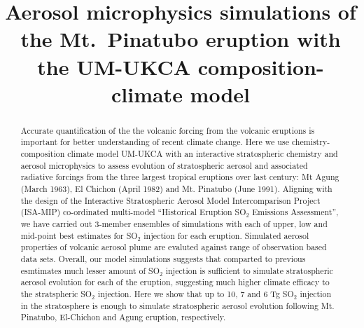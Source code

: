 \documentclass[acpd]{copernicus}
\begin{document}
\title{Aerosol microphysics simulations of the Mt.~Pinatubo eruption with the UM-UKCA composition-climate model}










\maketitle



\begin{abstract}
Accurate quantification of the the volcanic forcing from the volcanic eruptions is important for better understanding of recent climate change.
Here we use chemistry-composition climate model UM-UKCA with an interactive stratospheric chemistry and aerosol microphysics
to assess evolution of stratospheric aerosol and associated radiative forcings from the three largest tropical 
eruptions over last century: Mt Agung (March 1963), El Chichon (April 1982) and Mt. Pinatubo (June 1991). 
Aligning with the design of the Interactive Stratospheric Aerosol Model Intercomparison Project (ISA-MIP)
co-ordinated multi-model “Historical Eruption SO$_2$ Emissions Assessment”, we have 
carried out 3-member ensembles of simulations with each of upper, low and mid-point best estimates for SO$_2$ injection
for each eruption. Simulated aerosol properties of volcanic aerosol plume are evaluted against range of
observation based data sets. Overall, our model simulations suggests that comparted to previous esmtimates 
much lesser amount of SO$_2$ injection is sufficient to simulate stratospheric aerosol evolution for each of the eruption, suggesting 
much higher climate efficacy to the stratspheric SO$_2$ injection. 
Here we show that  up to 10, 7 and 6 Tg  SO$_2$ injection in the stratosphere is
enough to simulate stratospheric aerosol evolution following Mt. Pinatubo, El-Chichon and Agung eruption, respectively. 
\end{abstract}
\end{document}
